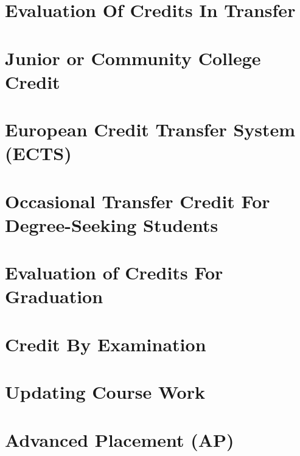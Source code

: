 \documentclass[
  letterpaper,
]{scrbook}
\begin{document}
\hypertarget{evaluation-of-credits-in-transfer}{%
\section{Evaluation Of Credits In
Transfer}\label{evaluation-of-credits-in-transfer}}

\hypertarget{junior-or-community-college-credit}{%
\section{Junior or Community College
Credit}\label{junior-or-community-college-credit}}

\hypertarget{european-credit-transfer-system-ects}{%
\section{European Credit Transfer System
(ECTS)}\label{european-credit-transfer-system-ects}}

\hypertarget{occasional-transfer-credit-for-degree-seeking-students}{%
\section{Occasional Transfer Credit For Degree-Seeking
Students}\label{occasional-transfer-credit-for-degree-seeking-students}}

\hypertarget{evaluation-of-credits-for-graduation}{%
\section{Evaluation of Credits For
Graduation}\label{evaluation-of-credits-for-graduation}}

\hypertarget{credit-by-examination}{%
\section{Credit By Examination}\label{credit-by-examination}}

\hypertarget{updating-course-work}{%
\section{Updating Course Work}\label{updating-course-work}}

\hypertarget{advanced-placement-ap}{%
\section{Advanced Placement (AP)}\label{advanced-placement-ap}}
\end{document}
